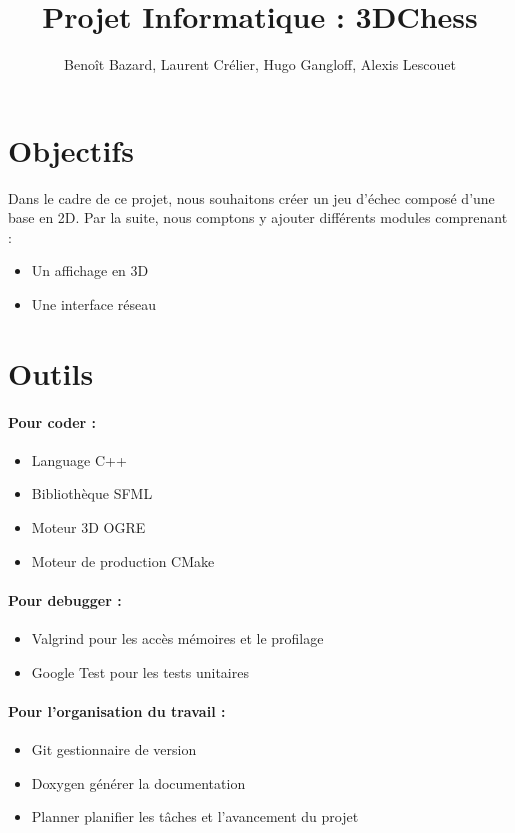 \documentclass[a4paper,11pt]{article}
\title{Projet Informatique : 3DChess}
\author{Benoît Bazard, Laurent Crélier, Hugo Gangloff, Alexis Lescouet}
\date{}
\begin{document}
\maketitle

\section*{Objectifs}

Dans le cadre de ce projet, nous souhaitons créer un jeu d'échec composé d'une base en 2D. Par la suite, nous comptons y ajouter différents modules comprenant :
\bigskip

\begin{itemize}
	\item Un affichage en 3D
	\item Une interface réseau
\end{itemize}

\section*{Outils}

\paragraph{Pour coder :}

\begin{itemize}
	\item Language C++
	\item Bibliothèque SFML
	\item Moteur 3D OGRE
	\item Moteur de production CMake
\end{itemize}

\paragraph{Pour debugger :}

\begin{itemize}
	\item Valgrind pour les accès mémoires et le profilage
	\item Google Test pour les tests unitaires
\end{itemize}

\paragraph{Pour l'organisation du travail :}

\begin{itemize}
	\item Git gestionnaire de version
	\item Doxygen générer la documentation
	\item Planner planifier les tâches et l'avancement du projet
\end{itemize}
\end{document}

